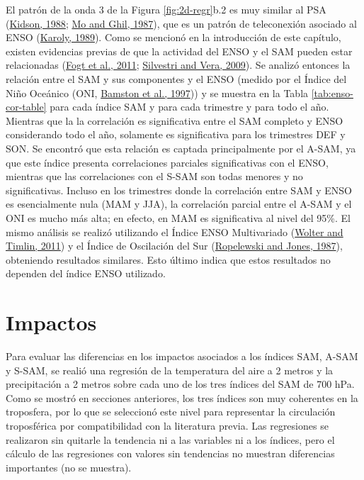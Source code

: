 \documentclass[12pt,oneside,a4paper]{reedthesis}
\begin{document}
El patrón de la onda 3 de la Figura \ref{fig:2d-regr}b.2 es muy similar al PSA (\protect\hyperlink{ref-kidson1988}{Kidson, 1988}; \protect\hyperlink{ref-mo1987}{Mo and Ghil, 1987}), que es un patrón de teleconexión asociado al ENSO (\protect\hyperlink{ref-karoly1989}{Karoly, 1989}).
Como se mencionó en la introducción de este capítulo, existen evidencias previas de que la actividad del ENSO y el SAM pueden estar relacionadas (\protect\hyperlink{ref-fogt2011a}{Fogt et al., 2011}; \protect\hyperlink{ref-silvestri2009}{Silvestri and Vera, 2009}).
Se analizó entonces la relación entre el SAM y sus componentes y el ENSO (medido por el Índice del Niño Oceánico (ONI, \protect\hyperlink{ref-bamston1997}{Bamston et al., 1997})) y se muestra en la Tabla \ref{tab:enso-cor-table} para cada índice SAM y para cada trimestre y para todo el año.
Mientras que la la correlación es significativa entre el SAM completo y ENSO considerando todo el año, solamente es significativa para los trimestres DEF y SON.
Se encontró que esta relación es captada principalmente por el A-SAM, ya que este índice presenta correlaciones parciales significativas con el ENSO, mientras que las correlaciones con el S-SAM son todas menores y no significativas.
Incluso en los trimestres donde la correlación entre SAM y ENSO es esencialmente nula (MAM y JJA), la correlación parcial entre el A-SAM y el ONI es mucho más alta; en efecto, en MAM es significativa al nivel del 95\%.
El mismo análisis se realizó utilizando el Índice ENSO Multivariado (\protect\hyperlink{ref-wolter2011}{Wolter and Timlin, 2011}) y el Índice de Oscilación del Sur (\protect\hyperlink{ref-ropelewski1987}{Ropelewski and Jones, 1987}), obteniendo resultados similares.
Esto último indica que estos resultados no dependen del índice ENSO utilizado.

\hypertarget{impacts}{%
\section{Impactos}\label{impacts}}

Para evaluar las diferencias en los impactos asociados a los índices SAM, A-SAM y S-SAM, se realió una regresión de la temperatura del aire a 2 metros y la precipitación a 2 metros sobre cada uno de los tres índices del SAM de 700 hPa.
Como se mostró en secciones anteriores, los tres índices son muy coherentes en la troposfera, por lo que se seleccionó este nivel para representar la circulación troposférica por compatibilidad con la literatura previa.
Las regresiones se realizaron sin quitarle la tendencia ni a las variables ni a los índices, pero el cálculo de las regresiones con valores sin tendencias no muestran diferencias importantes (no se muestra).
\end{document}
